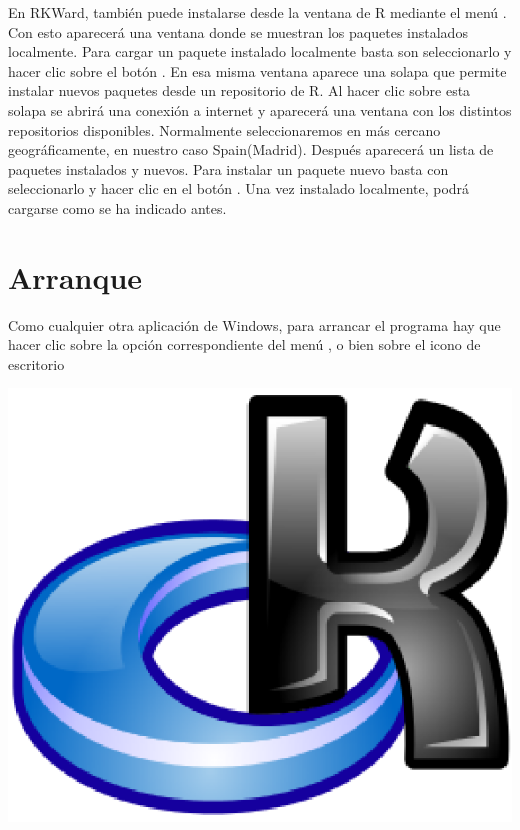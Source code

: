 En RKWard, también puede instalarse desde la ventana de R mediante el menú .
Con esto aparecerá una ventana donde se muestran los paquetes instalados localmente.
Para cargar un paquete instalado localmente basta son seleccionarlo y hacer clic sobre el botón .
En esa misma ventana aparece una solapa  que permite instalar nuevos paquetes desde un
repositorio de R.
Al hacer clic sobre esta solapa se abrirá una conexión a internet y aparecerá una ventana con los distintos
repositorios disponibles. Normalmente seleccionaremos en más cercano geográficamente, en nuestro caso Spain(Madrid).
Después aparecerá un lista de paquetes instalados y nuevos.
Para instalar un paquete nuevo basta con seleccionarlo y hacer clic en el botón .
Una vez instalado localmente, podrá cargarse como se ha indicado antes.


\section{Arranque}
Como cualquier otra aplicación de Windows, para arrancar el programa hay que hacer clic sobre la opción
correspondiente del menú , o bien sobre el icono de escritorio
\begin{center}
  \includegraphics[scale=0.3]{introduccion_r/img/icono_rkward}
\end{center}

